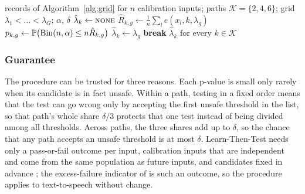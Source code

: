 \begin{algorithm}[!htbp]
\caption{Learn-Then-Test calibration of the residual threshold of each path}
\label{alg:ltt}
\small
\begin{algorithmic}[1]
\Require records of Algorithm~\ref{alg:grid} for $n$ calibration inputs; paths $\mathcal K=\{2,4,6\}$; grid $\lambda_1<\dots<\lambda_G$; $\alpha$, $\delta$
 
  \State $\hat\lambda_k \gets \textsc{none}$
    \State $\hat R_{k,g} \gets \frac1n\sum_{l} e(x_l,k,\lambda_g)$ 
    \State $p_{k,g} \gets \P\big(\mathrm{Bin}(n,\alpha)\le n\hat R_{k,g}\big)$
      \State $\hat\lambda_k\gets\lambda_g$
    \Else
      \State \textbf{break}
    \EndIf
  \EndFor
\EndFor
\State \Return $\hat\lambda_k$ for every $k\in\mathcal K$ 
\end{algorithmic}
\end{algorithm}

\subsubsection{Guarantee}

The procedure can be trusted for three reasons. Each p-value is small only rarely when its candidate is in fact unsafe. Within a path, testing in a fixed order means that the test can go wrong only by accepting the first unsafe threshold in the list, so that path's whole share $\delta/3$ protects that one test instead of being divided among all thresholds. Across paths, the three shares add up to $\delta$, so the chance that any path accepts an unsafe threshold is at most $\delta$. Learn-Then-Test needs only a pass-or-fail outcome per input, calibration inputs that are independent and come from the same population as future inputs, and candidates fixed in advance \parencite{angelopoulos2025ltt}; the excess-failure indicator of  is such an outcome, so the procedure applies to text-to-speech without change.

